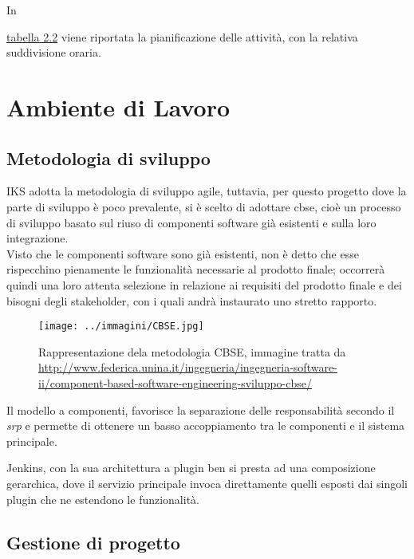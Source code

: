 In {\hyperref[tab:initial-plan]{tabella 2.2} viene riportata la pianificazione delle attività, con la relativa suddivisione oraria.



\newpage

\section{Ambiente di Lavoro}

\subsection{Metodologia di sviluppo}

IKS adotta la metodologia di sviluppo \gls{agile}, tuttavia, per questo progetto dove la parte di sviluppo è poco prevalente, si è scelto di adottare \gls{cbse}, cioè un processo di sviluppo basato sul riuso di componenti software già esistenti e sulla loro integrazione. \\ 
Visto che le componenti software sono già esistenti, non è detto che esse rispecchino pienamente le funzionalità necessarie al prodotto finale; occorrerà quindi una loro attenta selezione in relazione ai requisiti del prodotto finale e dei bisogni degli \gls{stakeholder}, con i quali andrà instaurato uno stretto rapporto.

\begin{figure}[H]
    \capstart
    \captionsetup{justification=centering}
    \centering
    \texttt{[image: ../immagini/CBSE.jpg]}
    \caption{Rappresentazione dela metodologia CBSE, immagine tratta da \url{http://www.federica.unina.it/ingegneria/ingegneria-software-ii/component-based-software-engineering-sviluppo-cbse/}}
\end{figure}

Il modello a componenti, favorisce la separazione delle responsabilità secondo il \textit{\gls{srp}} e permette di ottenere un basso accoppiamento tra le componenti e il sistema principale.

Jenkins, con la sua architettura a \gls{plugin} ben si presta ad una composizione gerarchica, dove il servizio principale invoca direttamente quelli esposti dai singoli \gls{plugin} che ne estendono le funzionalità.

\subsection{Gestione di progetto}

}
